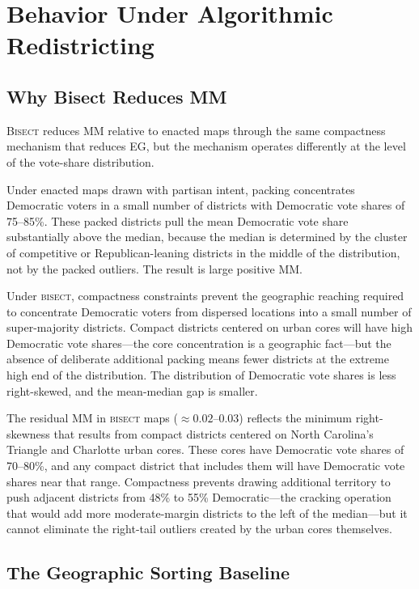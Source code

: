 \section{Behavior Under Algorithmic Redistricting}
\label{sec:behavior}

\subsection{Why Bisect Reduces MM}

\textsc{Bisect} reduces MM relative to enacted maps through the same compactness
mechanism that reduces EG, but the mechanism operates differently at the level
of the vote-share distribution.

Under enacted maps drawn with partisan intent, packing concentrates Democratic
voters in a small number of districts with Democratic vote shares of 75--85\%.
These packed districts pull the mean Democratic vote share substantially above
the median, because the median is determined by the cluster of competitive or
Republican-leaning districts in the middle of the distribution, not by the
packed outliers. The result is large positive MM.

Under \textsc{bisect}, compactness constraints prevent the geographic reaching
required to concentrate Democratic voters from dispersed locations into a small
number of super-majority districts. Compact districts centered on urban cores
will have high Democratic vote shares---the core concentration is a geographic
fact---but the absence of deliberate additional packing means fewer districts
at the extreme high end of the distribution. The distribution of Democratic
vote shares is less right-skewed, and the mean-median gap is smaller.

The residual MM in \textsc{bisect} maps ($\approx 0.02$--$0.03$) reflects the
minimum right-skewness that results from compact districts centered on North
Carolina's Triangle and Charlotte urban cores. These cores have Democratic vote
shares of 70--80\%, and any compact district that includes them will have
Democratic vote shares near that range. Compactness prevents drawing additional
territory to push adjacent districts from 48\% to 55\% Democratic---the cracking
operation that would add more moderate-margin districts to the left of the
median---but it cannot eliminate the right-tail outliers created by the urban cores
themselves.

\subsection{The Geographic Sorting Baseline}

